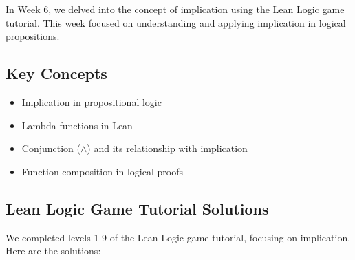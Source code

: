 \documentclass{article}
\begin{document}
In Week 6, we delved into the concept of implication using the Lean Logic game tutorial. This week focused on understanding and applying implication in logical propositions.

\subsection*{Key Concepts}

\begin{itemize}
    \item Implication in propositional logic
    \item Lambda functions in Lean
    \item Conjunction (\(\land\)) and its relationship with implication
    \item Function composition in logical proofs
\end{itemize}

\subsection*{Lean Logic Game Tutorial Solutions}

We completed levels 1-9 of the Lean Logic game tutorial, focusing on implication. Here are the solutions:
\end{document}

